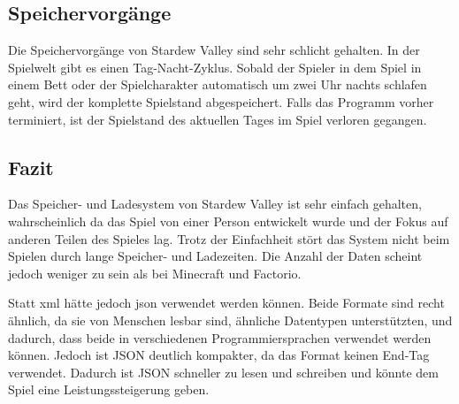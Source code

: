 \subsection{Speichervorgänge}
Die Speichervorgänge von Stardew Valley sind sehr schlicht gehalten. In der Spielwelt gibt es einen Tag-Nacht-Zyklus. Sobald der Spieler in dem Spiel in einem Bett oder der Spielcharakter automatisch um zwei Uhr nachts schlafen geht, wird der komplette Spielstand abgespeichert. Falls das Programm vorher terminiert, ist der Spielstand des aktuellen Tages im Spiel verloren gegangen.\cite{stardewvalleywikiSaves}

\subsection{Fazit}
Das Speicher- und Ladesystem von Stardew Valley ist sehr einfach gehalten, wahrscheinlich da das Spiel von einer Person entwickelt wurde und der Fokus auf anderen Teilen des Spieles lag. Trotz der Einfachheit stört das System nicht beim Spielen durch lange Speicher- und Ladezeiten. Die Anzahl der Daten scheint jedoch weniger zu sein als bei Minecraft und Factorio. 

Statt \ac{xml} hätte jedoch \ac{json} verwendet werden können. Beide Formate sind recht ähnlich, da sie von Menschen lesbar sind, ähnliche Datentypen unterstützten, und dadurch, dass beide in verschiedenen Programmiersprachen verwendet werden können. Jedoch ist JSON deutlich kompakter, da das Format keinen End-Tag verwendet. Dadurch ist JSON schneller zu lesen und schreiben und könnte dem Spiel eine Leistungssteigerung geben.\cite{w3schoolsJSONvsXML}